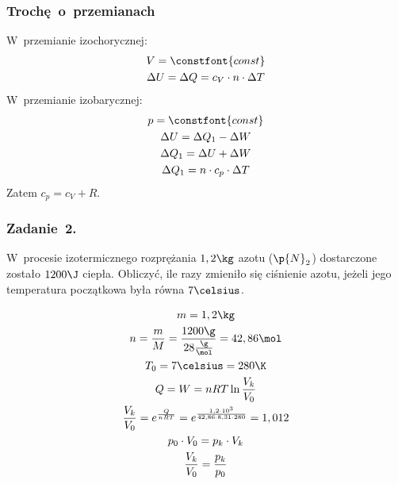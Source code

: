\subsubsection*{Trochę o~przemianach}
W~przemianie izochorycznej:
\begin{gather*}
    V = \constfont{const}\\
    \Delta U = \Delta Q = c_V \cdot n \cdot \Delta T
\end{gather*}
W~przemianie izobarycznej:
\begin{gather*}
    p = \constfont{const}\\
    \Delta U = \Delta Q_1 - \Delta W\\
    \Delta Q_1 = \Delta U + \Delta W\\
    \Delta Q_1 = n \cdot c_p \cdot \Delta T\\
\end{gather*}
Zatem \(c_p = c_V + R\).
\subsubsection*{Zadanie~2.}
\begin{statement}
    W~procesie izotermicznego rozprężania \(1,2\kg\) azotu (\(\p{N}_2\)) dostarczone zostało \(1200\J\) ciepła. Obliczyć, ile razy zmieniło się ciśnienie azotu, jeżeli jego temperatura początkowa była równa \(7\celsius\).
\end{statement}
\begin{gather*}
    m = 1,2\kg\\
    n = \frac{m}{M} = \frac{1200\g}{28\frac{\g}{\mol}} = 42,86\mol\\
    T_0 = 7\celsius = 280\K\\
    Q = W = nRT \ln \frac{V_k}{V_0}\\
    \frac{V_k}{V_0} = e^{\frac{Q}{nRT}} = e^{\frac{1,2 \cdot 10^3}{42,86 \cdot 8,31 \cdot 280}} = 1,012\\
    p_0 \cdot V_0 = p_k \cdot V_k\\
    \frac{V_k}{V_0} = \frac{p_k}{p_0}
\end{gather*}
